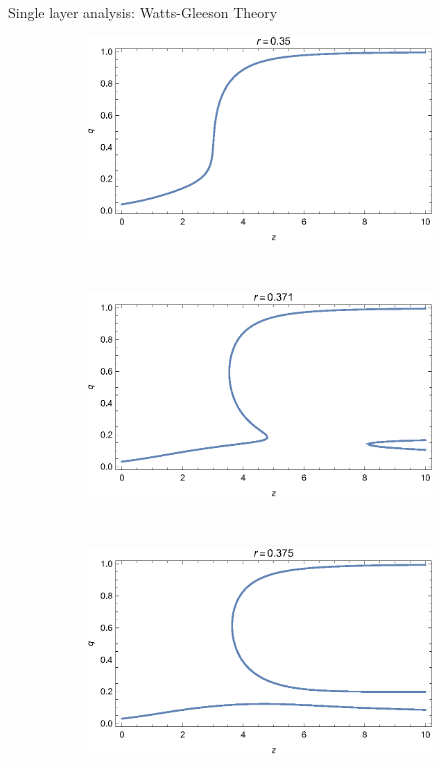\documentclass[10pt, xcolor=dvipsnames]{beamer}
\begin{document}
\begin{frame}{Single layer analysis: Watts-Gleeson Theory}
\begin{figure}
    \centering
    \begin{subfigure}[b]{0.4\textwidth}
        \includegraphics[width=\textwidth]{figures/one_layer_qz_r035}
    \end{subfigure}
    ~ %
    \begin{subfigure}[b]{0.4\textwidth}
        \includegraphics[width=\textwidth]{figures/one_layer_qz_r0371}
    \end{subfigure}
    ~ %
    \begin{subfigure}[b]{0.4\textwidth}
        \includegraphics[width=\textwidth]{figures/one_layer_qz_r0375}

\end{subfigure}
\end{figure}
\end{frame}
\end{document}
